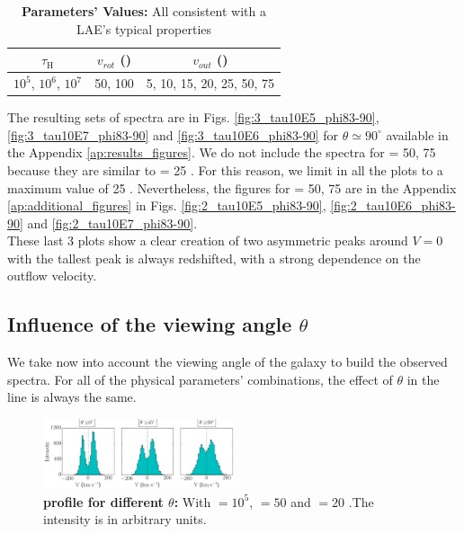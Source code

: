 \documentclass[twocolappendix]{latex/emulateapj}
\begin{document}
\begin{table}[htbp]
	\centering
	\begin{tabular}{|c|c|c|}
		\hline
		$\tau_{\mathrm{H}}$ & $v_{rot}$ (\kms) & $v_{out}$ (\kms) \\
		\hline
		$10^5$, $10^6$, $10^7$ & 50, 100 & 5, 10, 15, 20, 25, 50, 75 \\
		\hline
	\end{tabular}
	\caption{\textbf{Parameters' Values:} All consistent with a LAE's typical properties}
	\label{tab:values}
\end{table}

The resulting sets of spectra are in Figs. \ref{fig:3_tau10E5_phi83-90}, \ref{fig:3_tau10E7_phi83-90} and \ref{fig:3_tau10E6_phi83-90} for $\theta \simeq 90^\circ$ available in the Appendix \ref{ap:results_figures}. We do not include the spectra for \vout = 50, 75 \kms because they are similar to \vout = 25 \kms. For this reason, we limit in all the plots \vout to a maximum value of 25 \kms. Nevertheless, the figures for \vout = 50, 75 \kms are in the Appendix \ref{ap:additional_figures} in Figs. \ref{fig:2_tau10E5_phi83-90}, \ref{fig:2_tau10E6_phi83-90} and \ref{fig:2_tau10E7_phi83-90}.\\

These last 3 plots show a clear creation of two asymmetric peaks around $V=0$ \kms with the tallest peak is always redshifted, with a strong dependence on the outflow velocity.\\

\subsection{Influence of the viewing angle $\theta$}
We take now into account the viewing angle of the galaxy to build the observed spectra. For all of the physical parameters' combinations, the effect of $\theta$ in the \lya line is always the same.\\

\begin{figure}[h!]
	\begin{center}
		\includegraphics[width=0.5\textwidth]{./figures/influence_viewing_angle_5}
	\end{center}
	\caption{\textbf{\lya profile for different $\theta$:} With \tauh$=10^5$, \vrot$=50$ \kms and \vout$=20$ \kms.The intensity is in arbitrary units.
		\label{fig:influence_viewing_angle_5}}
\end{figure}
\end{document}
